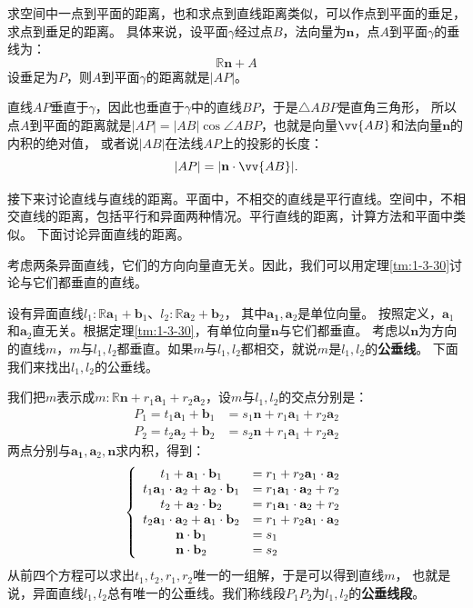 \documentclass[12pt,UTF8,fontset=none]{ctexbook}
\begin{document}
求空间中一点到平面的距离，也和求点到直线距离类似，可以作点到平面的垂足，求点到垂足的距离。
具体来说，设平面$\gamma$经过点$B$，法向量为$\mathbf{n}$，点$A$到平面$\gamma$的垂线为：
$$ \mathbb{R}\mathbf{n} + A$$
设垂足为$P$，则$A$到平面$\gamma$的距离就是$|AP|$。

直线$AP$垂直于$\gamma$，因此也垂直于$\gamma$中的直线$BP$，于是$\triangle ABP$是直角三角形，
所以点$A$到平面的距离就是$|AP| = |AB|\cos{\angle ABP}$，也就是向量$\vv{AB}$和法向量$\mathbf{n}$的内积的绝对值，
或者说$|AB|$在法线$AP$上的投影的长度：
$$ |AP| = |\mathbf{n}\cdot \vv{AB}|. $$

接下来讨论直线与直线的距离。平面中，不相交的直线是平行直线。空间中，不相交直线的距离，包括平行和异面两种情况。平行直线的距离，计算方法和平面中类似。
下面讨论异面直线的距离。

考虑两条异面直线，它们的方向向量直无关。因此，我们可以用定理\ref{tm:1-3-30}讨论与它们都垂直的直线。

设有异面直线$l_1:\mathbb{R}\mathbf{a}_1 + \mathbf{b}_1$、$l_2:\mathbb{R}\mathbf{a}_2 + \mathbf{b}_2$，
其中$\mathbf{a_1}, \mathbf{a}_2$是单位向量。
按照定义，$\mathbf{a}_1$和$\mathbf{a}_2$直无关。根据定理\ref{tm:1-3-30}，有单位向量$\mathbf{n}$与它们都垂直。
考虑以$\mathbf{n}$为方向的直线$m$，$m$与$l_1,l_2$都垂直。如果$m$与$l_1,l_2$都相交，就说$m$是$l_1,l_2$的\textbf{公垂线}。
下面我们来找出$l_1,l_2$的公垂线。

我们把$m$表示成$m: \mathbb{R}\mathbf{n} + r_1\mathbf{a}_1 + r_2\mathbf{a}_2$，设$m$与$l_1,l_2$的交点分别是：
\begin{align*}
    P_1 = t_1\mathbf{a}_1 + \mathbf{b}_1 &= s_1\mathbf{n} + r_1\mathbf{a}_1 + r_2\mathbf{a}_2  \\
    P_2 = t_2\mathbf{a}_2 + \mathbf{b}_2 &= s_2\mathbf{n} + r_1\mathbf{a}_1 + r_2\mathbf{a}_2  
\end{align*}
两点分别与$\mathbf{a_1}, \mathbf{a}_2,\mathbf{n}$求内积，得到：
$$
\left\{
\begin{array}[]{cl}
    t_1 + \mathbf{a}_1\cdot\mathbf{b}_1 &= r_1 + r_2\mathbf{a}_1\cdot\mathbf{a}_2 \\
    t_1\mathbf{a}_1\cdot\mathbf{a}_2 + \mathbf{a}_2\cdot\mathbf{b}_1 &= r_1\mathbf{a}_1\cdot\mathbf{a}_2 + r_2 \\
    t_2 + \mathbf{a}_2\cdot\mathbf{b}_2 &= r_1\mathbf{a}_1\cdot\mathbf{a}_2 + r_2 \\
    t_2\mathbf{a}_1\cdot\mathbf{a}_2 + \mathbf{a}_1\cdot\mathbf{b}_2 &= r_1 + r_2\mathbf{a}_1\cdot\mathbf{a}_2 \\
    \mathbf{n}\cdot\mathbf{b}_1 &= s_1 \\
    \mathbf{n}\cdot\mathbf{b}_2 &= s_2
\end{array}
\right.
$$
从前四个方程可以求出$t_1,t_2,r_1,r_2$唯一的一组解，于是可以得到直线$m$，
也就是说，异面直线$l_1,l_2$总有唯一的公垂线。我们称线段$P_1P_2$为$l_1,l_2$的\textbf{公垂线段}。
\end{document}
